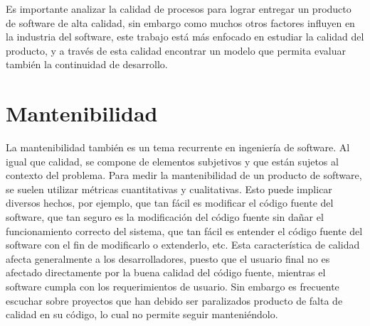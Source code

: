 Es importante analizar la calidad de procesos para lograr entregar un producto
de software de alta calidad, sin embargo como muchos otros factores influyen
en la industria del software, este trabajo está más enfocado en estudiar
la calidad del producto, y a través de esta calidad encontrar un modelo que
permita evaluar también la continuidad de desarrollo.

\section{Mantenibilidad}

La mantenibilidad también es un tema recurrente en ingeniería de software.
Al igual que calidad, se compone de elementos subjetivos y que están sujetos
al contexto del problema. Para medir la mantenibilidad de un producto de
software, se suelen utilizar métricas cuantitativas y cualitativas.
Esto puede implicar diversos hechos, por ejemplo, que tan fácil es modificar
el código fuente del software, que tan seguro es la modificación del código
fuente sin dañar el funcionamiento correcto del sistema, que tan fácil es entender el código
fuente del software con el fin de modificarlo o extenderlo, etc.
Esta característica de calidad afecta generalmente a los desarrolladores,
puesto que el usuario final no es afectado directamente por la buena calidad
del código fuente, mientras el software cumpla con los requerimientos de usuario.
Sin embargo es frecuente escuchar sobre proyectos que han debido ser paralizados
producto de falta de calidad en su código, lo cual no permite seguir
manteniéndolo.

